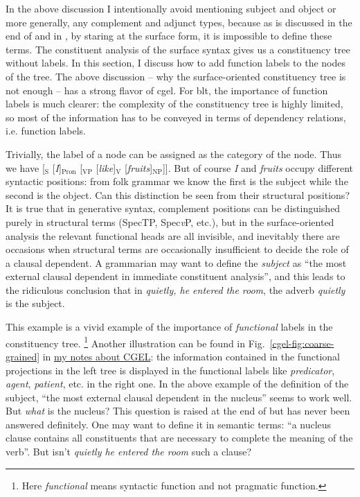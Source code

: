 \documentclass{article}
\newcommand*{\citefig}[1]{Fig.~{#1}}
\newcommand*{\term}[1]{\emph{#1}}
\newcommand*{\corpus}[1]{\emph{#1}}
\newcommand*{\vP}{\textit{v}P}
\newcommand{\cgel}{\href{../English/cambridge.pdf}{my notes about CGEL}}
\begin{document}
In the above discussion I intentionally avoid mentioning subject and object
or more generally, any complement and adjunct types,
because as is discussed in the end of 
and in ,
by staring at the surface form,
it is impossible to define these terms.
The constituent analysis of the surface syntax 
gives us a constituency tree without labels.
In this section, I discuss how to add function labels to the nodes of the tree.
The above discussion -- why the surface-oriented constituency tree is not enough -- 
has a strong flavor of \ac{cgel}.
For \ac{blt}, the importance of function labels is much clearer:
the complexity of the constituency tree is highly limited,
so most of the information has to be conveyed in terms of 
dependency relations, i.e. function labels.

Trivially, the label of a node can be assigned as the category of the node.
Thus we have 
{[$_{\text{S}}$ [\corpus{I}]$_{\text{Pron}}$ [$_{\text{VP}}$ [\corpus{like}]$_{\text{V}}$ [\corpus{fruits}]$_{\text{NP}}$]]}.
But of course \corpus{I} and \corpus{fruits} occupy different syntactic positions:
from folk grammar we know the first is the subject while the second is the object.
Can this distinction be seen from their structural positions?
It is true that in generative syntax,
complement positions can be distinguished purely in structural terms 
(SpecTP, Spec\vP, etc.),
but in the surface-oriented analysis the relevant functional heads are all invisible,
and inevitably there are occasions 
when structural terms are occasionally insufficient to decide the role of a clausal dependent.
A grammarian may want to define the \term{subject} as 
``the most external clausal dependent in immediate constituent analysis'',
and this leads to the ridiculous conclusion that 
in \corpus{quietly, he entered the room}, 
the adverb \corpus{quietly} is the subject.

This example is a vivid example of the importance of \emph{functional} labels in the constituency tree.%
\footnote{
    Here \term{functional} means syntactic function and not pragmatic function.
}
Another illustration can be found in \citefig{\ref{cgel-fig:coarse-grained}} in \cgel:
the information contained in the functional projections in the left tree 
is displayed in the functional labels like \term{predicator}, \term{agent}, \term{patient}, etc.
in the right one.
In the above example of the definition of the subject,
``the most external clausal dependent in the nucleus'' seems to work well.
But \emph{what} is the nucleus?
This question is raised at the end of  
but has never been answered definitely.
One may want to define it in semantic terms:
``a nucleus clause contains all constituents that are necessary to complete the meaning of the verb''.
But isn't \corpus{quietly he entered the room} such a clause?
\end{document}

